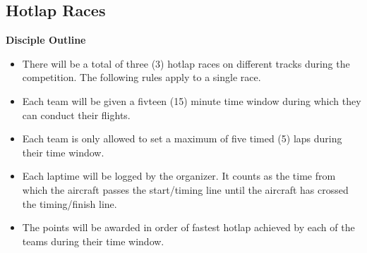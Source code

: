     \subsection{Hotlap Races}
    \textbf{Disciple Outline}
    \begin{itemize}
      \item There will be a total of three (3) hotlap races on different tracks during the competition. The following rules apply to a single race.
      \item Each team will be given a fivteen (15) minute time window during which they can conduct their flights. 
      \item Each team is only allowed to set a maximum of five timed (5) laps during their time window. 
      \item Each laptime will be logged by the organizer. It counts as the time from which the aircraft passes the start/timing line until the aircraft has crossed the timing/finish line. 
      \item The points will be awarded in order of fastest hotlap achieved by each of the teams during their time window.
    \end{itemize}

